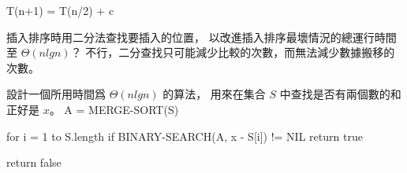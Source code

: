 \startformula
T(n+1) = T(n/2) + c
\stopformula
\stopANSWER

\startEXERCISE
插入排序時用二分法查找要插入的位置，
以改進插入排序最壞情況的總運行時間至 $\Theta(nlgn)$？
\stopEXERCISE
\startANSWER
不行，二分查找只可能減少比較的次數，而無法減少數據搬移的次數。
\stopANSWER

\startEXERCISE
設計一個所用時間爲 $\Theta(nlgn)$ 的算法，
用來在集合 $S$ 中查找是否有兩個數的和正好是 $x$。
\stopEXERCISE
\startANSWER
{}
\startCLRS
A = MERGE-SORT(S)

for i = 1 to S.length
	if BINARY-SEARCH(A, x - S[i]) != NIL
		return true

return false
\stopCLRS
\stopANSWER

\stopsection
